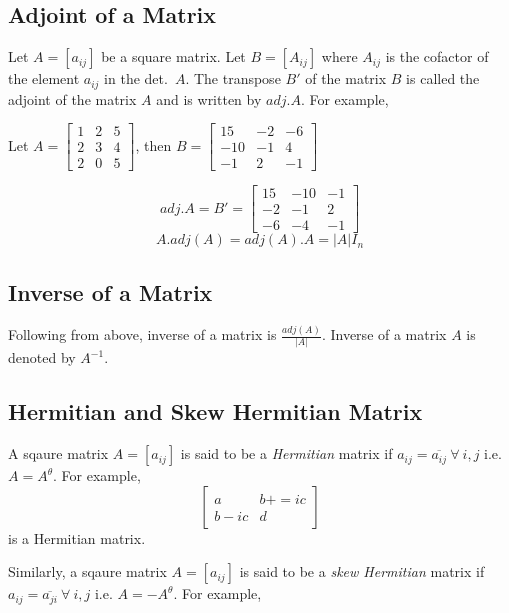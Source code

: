 \subsection{Adjoint of a Matrix}
Let $A= [a_{ij}]$ be a square matrix. Let $B = [A_{ij}]$ where $A_{ij}$ is the cofactor of the element $a_{ij}$ in the
det.\ $A$. The transpose $B'$ of the matrix $B$ is called the adjoint of the matrix $A$ and is written by $adj. A$. For example,

Let $A = \begin{bmatrix}1 & 2& 5\\2 & 3 & 4\\2& 0 & 5\end{bmatrix}$, then
$B = \begin{bmatrix}15 & -2 & -6\\-10 & -1 & 4\\-1 & 2 & -1\end{bmatrix}$

\[adj. A = B' = \begin{bmatrix}15& -10 & -1\\-2 & -1 & 2\\-6 & -4 & -1\end{bmatrix}\]
\[A.adj(A) = adj(A).A = |A|I_n\]

\subsection{Inverse of a Matrix}
Following from above, inverse of a matrix is $\frac{adj(A)}{|A|}$. Inverse of a matrix $A$ is denoted by $A^{-1}$.

\subsection{Hermitian and Skew Hermitian Matrix}
A sqaure matrix $A = [a_{ij}]$ is said to be a \textit{Hermitian} matrix if $a_{ij} = \overline{a_{ij}}~\forall~i, j$ i.e. $A =
A^{\theta}$. For example,
\[\begin{bmatrix}a & b += ic \\ b - ic & d\end{bmatrix}\] is a Hermitian
matrix.

Similarly, a sqaure matrix $A = [a_{ij}]$ is said to be a \textit{skew Hermitian} matrix if $a_{ij} = \overline{a_{ji}}~\forall~i,
j$ i.e. $A = -A^{\theta}$. For example,

